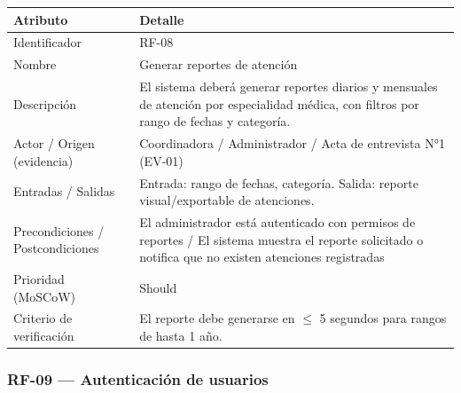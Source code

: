 \documentclass[11pt,a4paper]{article}
\begin{document}
	\begin{longtable}{p{} p{}}
		
		\toprule
		\textbf{Atributo} & \textbf{Detalle} \\
		\midrule
		\endhead
		
		Identificador & RF-08 \\
		Nombre & Generar reportes de atención \\
		Descripción & El sistema deberá generar reportes diarios y mensuales de atención por especialidad médica, con filtros por rango de fechas y categoría. \\
		Actor / Origen (evidencia) & Coordinadora / Administrador / Acta de entrevista N°1 (EV-01) \\
		Entradas / Salidas & Entrada: rango de fechas, categoría. Salida: reporte visual/exportable de atenciones. \\
		Precondiciones / Postcondiciones & El administrador está autenticado con permisos de reportes / El sistema muestra el reporte solicitado o notifica que no existen atenciones registradas \\
		Prioridad (MoSCoW) & Should \\
		Criterio de verificación & El reporte debe generarse en \(\leq\) 5 segundos para rangos de hasta 1 año. \\
		
		\bottomrule
	\end{longtable}
	
	\subsubsection{RF-09 --- Autenticación de usuarios}
	
\end{document}
